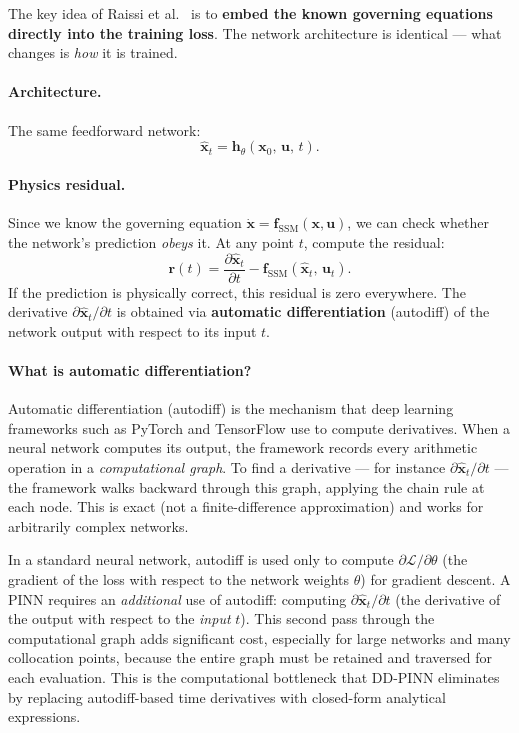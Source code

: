\documentclass[11pt]{article}
\newcommand{\xhat}{\hat{\bm{x}}}
\newcommand{\uvec}{\bm{u}}
\newcommand{\xvec}{\bm{x}}
\newcommand{\fssm}{\bm{f}_{\mathrm{SSM}}}
\begin{document}
The key idea of Raissi et al.~\cite{Raissi2019} is to \textbf{embed the known governing equations directly into the training loss}. The network architecture is identical --- what changes is \emph{how} it is trained.

\paragraph{Architecture.} The same feedforward network:
\begin{equation}
    \xhat_t = \bm{h}_\theta(\xvec_0,\, \uvec,\, t).
\end{equation}

\paragraph{Physics residual.} Since we know the governing equation $\dot{\xvec} = \fssm(\xvec, \uvec)$, we can check whether the network's prediction \emph{obeys} it. At any point $t$, compute the residual:
\begin{equation}
    \bm{r}(t) = \frac{\partial \xhat_t}{\partial t} - \fssm(\xhat_t,\, \uvec_t).
    \label{eq:residual}
\end{equation}
If the prediction is physically correct, this residual is zero everywhere. The derivative $\partial \xhat_t / \partial t$ is obtained via \textbf{automatic differentiation} (autodiff) of the network output with respect to its input $t$.

\paragraph{What is automatic differentiation?} Automatic differentiation (autodiff) is the mechanism that deep learning frameworks such as PyTorch and TensorFlow use to compute derivatives. When a neural network computes its output, the framework records every arithmetic operation in a \emph{computational graph}. To find a derivative --- for instance $\partial \xhat_t / \partial t$ --- the framework walks backward through this graph, applying the chain rule at each node. This is exact (not a finite-difference approximation) and works for arbitrarily complex networks.

In a standard neural network, autodiff is used only to compute $\partial \mathcal{L} / \partial \theta$ (the gradient of the loss with respect to the network weights $\theta$) for gradient descent. A PINN requires an \emph{additional} use of autodiff: computing $\partial \xhat_t / \partial t$ (the derivative of the output with respect to the \emph{input} $t$). This second pass through the computational graph adds significant cost, especially for large networks and many collocation points, because the entire graph must be retained and traversed for each evaluation. This is the computational bottleneck that DD-PINN eliminates by replacing autodiff-based time derivatives with closed-form analytical expressions.
\end{document}
